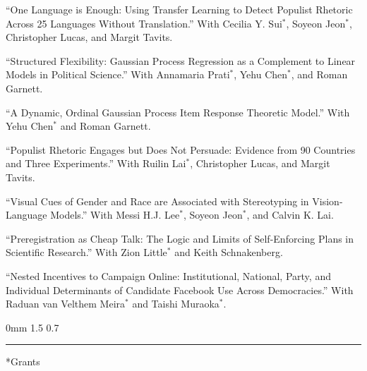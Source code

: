 \documentclass[10pt]{article}
\makeatletter
\renewcommand{\section}{\@startsection{section}{12}
{0mm}
{1.5\baselineskip}
{0.7\baselineskip}
{\large\bfseries\scshape\color{washu}\hrule\vspace{0.8\baselineskip}}}
\renewenvironment{CV}
  {\begin{list}{}
    {\renewcommand{\makelabel}{\entrylabel}
    \setlength{\labelwidth}{55pt}
    \setlength{\leftmargin}{62pt}
  }}
  {\end{list}}
\newcommand{\student}[1]{#1$^{*}$}
\makeatother
\begin{document}
\begin{CV}

\item[] ``One Language is Enough: Using Transfer Learning to Detect Populist Rhetoric Across 25 Languages Without Translation.'' With \student{Cecilia Y. Sui}, \student{Soyeon Jeon}, Christopher Lucas, and Margit Tavits.

\item[] ``Structured Flexibility: Gaussian Process Regression as a Complement to Linear Models in Political Science.'' With \student{Annamaria Prati}, \student{Yehu Chen}, and Roman Garnett.

\item[] ``A Dynamic, Ordinal Gaussian Process Item Response Theoretic Model.'' With \student{Yehu Chen} and Roman Garnett.

\item[] ``Populist Rhetoric Engages but Does Not Persuade: Evidence from 90 Countries and Three Experiments.'' With \student{Ruilin Lai}, Christopher Lucas, and Margit Tavits.

\item[] ``Visual Cues of Gender and Race are Associated with Stereotyping in Vision-Language Models.'' With \student{Messi H.J. Lee}, \student{Soyeon Jeon}, and Calvin K. Lai.

\item[] ``Preregistration as Cheap Talk: The Logic and Limits of Self-Enforcing Plans in Scientific Research.'' With \student{Zion Little} and Keith Schnakenberg.

\item[] ``Nested Incentives to Campaign Online: Institutional, National, Party, and Individual Determinants of Candidate Facebook Use Across Democracies.'' With \student{Raduan van Velthem Meira} and \student{Taishi Muraoka}.

\end{CV}

\vspace{0.5em}


\section*{Grants}
\end{document}

